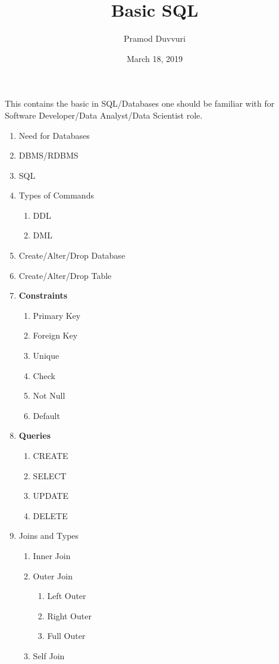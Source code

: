 \documentclass[11pt]{article}
\title{Basic SQL}
\author{Pramod Duvvuri}
\date{March 18, 2019}
\begin{document}
	\maketitle
	This contains the basic in SQL/Databases one should be familiar with for Software Developer/Data Analyst/Data Scientist role. 
	\begin{enumerate}
	\item Need for Databases
	\item DBMS/RDBMS
	\item SQL
	\item Types of Commands
	\begin{enumerate}
		\item DDL
		\item DML
	\end{enumerate}	
    \item Create/Alter/Drop Database 
     \item Create/Alter/Drop Table 
    \item \textbf{Constraints}
    \begin{enumerate}
    	\item Primary Key
    	\item Foreign Key
    	\item Unique
    	\item Check
    	\item Not Null
    	\item Default
    \end{enumerate}
    \item \textbf{Queries}
    \begin{enumerate}
    	\item CREATE
    	\item SELECT
    	\item UPDATE
    	\item DELETE
    \end{enumerate}
   \item Joins and Types
   \begin{enumerate}
   	\item Inner Join
   	\item Outer Join
   	\begin{enumerate}
   		\item Left Outer
   		\item Right Outer
   		\item Full Outer 
   	\end{enumerate}
   \item Self Join

\end{enumerate}
\end{enumerate}
\end{document}
